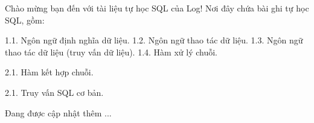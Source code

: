 Chào mừng bạn đến với tài liệu tự học SQL của Log! Nơi đây chứa bài ghi tự học SQL, gồm:

1.1. Ngôn ngữ định nghĩa dữ liệu.
1.2. Ngôn ngữ thao tác dữ liệu.
1.3. Ngôn ngữ thao tác dữ liệu (truy vấn dữ liệu).
1.4. Hàm xử lý chuỗi.

2.1. Hàm kết hợp chuỗi.

2.1. Truy vấn SQL cơ bản.

Đang được cập nhật thêm ...
